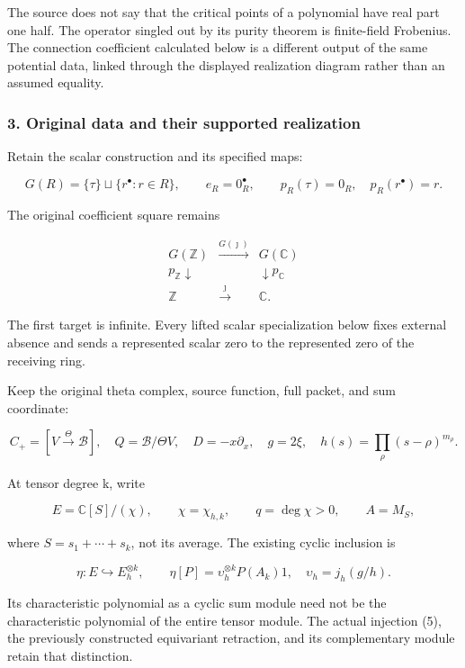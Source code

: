 The source does not say that the critical points of a polynomial have real part one half. The operator singled out by its purity theorem is finite-field Frobenius. The connection coefficient calculated below is a different output of the same potential data, linked through the displayed realization diagram rather than an assumed equality.

\subsubsection{3. Original data and their supported realization}\label{endpoint-exponential_original--original-data-and-their-supported-realization}

Retain the scalar construction and its specified maps:

\[
G(R)=\{\tau\}\sqcup\{r^\bullet:r\in R\},\qquad e_R=0_R^\bullet,
\qquad p_R(\tau)=0_R,\quad p_R(r^\bullet)=r.
\tag{1}
\]

The original coefficient square remains

\[
\begin{array}{ccc}
G(\mathbb Z)&\xrightarrow{G(\jmath)}&G(\mathbb C)\\
p_{\mathbb Z}\downarrow&&\downarrow p_{\mathbb C}\\
\mathbb Z&\xrightarrow{\jmath}&\mathbb C.
\end{array}
\tag{2}
\]

The first target is infinite. Every lifted scalar specialization below fixes external absence and sends a represented scalar zero to the represented zero of the receiving ring.

Keep the original theta complex, source function, full packet, and sum coordinate:

\[
C_+=[V\xrightarrow{\Theta}\mathscr B],\quad
Q=\mathscr B/\Theta V,\quad D=-x\partial_x,\quad g=2\xi,
\quad h(s)=\prod_\rho(s-\rho)^{m_\rho}.
\tag{3}
\]

At tensor degree k, write

\[
E=\mathbb C[S]/(\chi),\qquad \chi=\chi_{h,k},\qquad q=\deg\chi>0,
\qquad A=M_S,
\tag{4}
\]

where \(S=s_1+\cdots+s_k\), not its average. The existing cyclic inclusion is

\[
\eta:E\hookrightarrow E_h^{\otimes k},\qquad
\eta[P]=\upsilon_h^{\otimes k}P(A_k)1,
\quad \upsilon_h=j_h(g/h).
\tag{5}
\]

Its characteristic polynomial as a cyclic sum module need not be the characteristic polynomial of the entire tensor module. The actual injection (5), the previously constructed equivariant retraction, and its complementary module retain that distinction.

